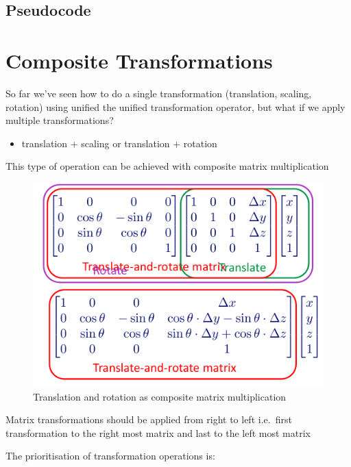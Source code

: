\documentclass[
]{book}
\providecommand{\tightlist}{%
  \setlength{\itemsep}{0pt}\setlength{\parskip}{0pt}}
\begin{document}
\hypertarget{pseudocode}{%
\subsection{Pseudocode}\label{pseudocode}}

\hypertarget{composite-transformations}{%
\section{Composite Transformations}\label{composite-transformations}}

So far we've seen how to do a {single transformation} (translation, scaling, rotation) using unified the unified transformation operator, but what if we apply {multiple transformations}?

\begin{itemize}
\tightlist
\item
  {translation + scaling or translation + rotation}
\end{itemize}

This type of operation can be achieved with {composite matrix multiplication}

\begin{figure}
\centering
\includegraphics{img/08-image22.png}
\caption{\label{fig:composite-mult}Translation and rotation as composite matrix multiplication}
\end{figure}

Matrix transformations should be applied from right to left i.e.~first transformation to the right most matrix and last to the left most matrix

The prioritisation of transformation operations is:
\end{document}
